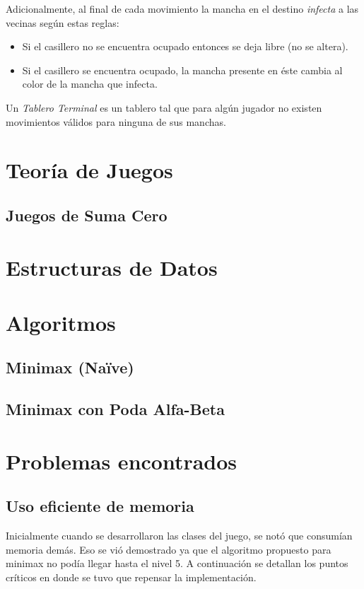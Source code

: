 \documentclass[10pt,a4paper,notitlepage,twocolumn,draft]{article}
\newenvironment{definition}[1][Definición]{\begin{trivlist}
\item[\hskip \labelsep {\bfseries #1}]}{\end{trivlist}}
\begin{document}
Adicionalmente, al final de cada movimiento la mancha en el destino \textit{infecta} a las vecinas según estas reglas:
\begin{itemize}
\item Si el casillero no se encuentra ocupado entonces se deja libre (no se altera).
\item Si el casillero se encuentra ocupado, la mancha presente en éste cambia al color de la mancha que infecta.
\end{itemize}

\begin{definition}
Un \textit{Tablero Terminal} es un tablero tal que para algún jugador no existen movimientos válidos para ninguna de sus manchas.
\end{definition}

\section{Teoría de Juegos}
\subsection{Juegos de Suma Cero}
\section{Estructuras de Datos}
\section{Algoritmos}
\subsection{Minimax (Na\"ive)}
\subsection{Minimax con Poda Alfa-Beta}
\section{Problemas encontrados}
\subsection{Uso eficiente de memoria}
  Inicialmente cuando se desarrollaron las clases del juego, se notó que consumían memoria demás.
  Eso se vió demostrado ya que el algoritmo propuesto para minimax no podía llegar hasta el nivel 5.
  A continuación se detallan los puntos críticos en donde se tuvo que repensar la implementación.
\end{document}
